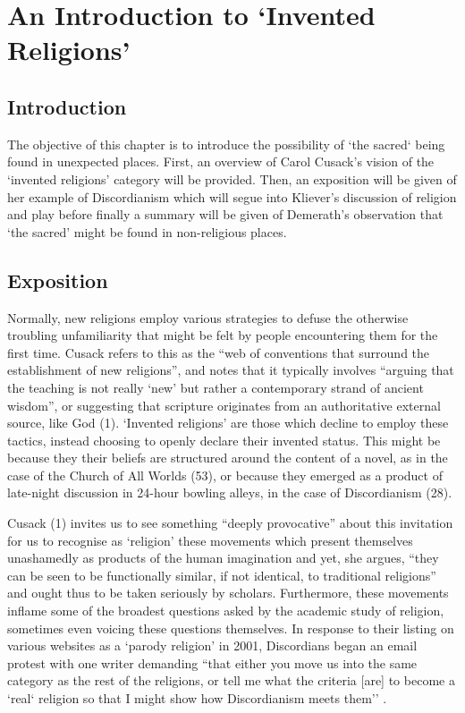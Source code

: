 \documentclass[Draft.tex]{subfiles}
\begin{document}
\chapter{An Introduction to `Invented Religions'}

\section*{Introduction}
The objective of this chapter is to introduce the possibility of
`the sacred` being found in unexpected places.
First, an overview of Carol Cusack's vision of
the `invented religions' category will be provided.
Then, an exposition will be given of her example of Discordianism
which will segue into Kliever's discussion of religion and play
before finally a summary will be given of Demerath's observation
that `the sacred' might be found in non-religious places.


\section*{Exposition}
Normally, new religions employ various strategies
to defuse the otherwise troubling unfamiliarity
that might be felt by people encountering them for the first time.
Cusack refers to this as the
``web of conventions that surround the establishment of new religions'',
and notes that it typically involves
``arguing that the teaching is not really `new' but rather
a contemporary strand of ancient wisdom'',
or suggesting that scripture originates from
an authoritative external source, like God (1).
`Invented religions' are those which decline to employ these tactics,
instead choosing to openly declare their invented status.
This might be because they their beliefs are structured around
the content of a novel,
as in the case of the Church of All Worlds (53),
or because they emerged as a product of late-night discussion in
24-hour bowling alleys, in the case of Discordianism (28).

Cusack (1) invites us to see something ``deeply provocative''
about this invitation for us to recognise as `religion'
these movements which present themselves unashamedly as
products of the human imagination and yet, she argues,
``they can be seen to be functionally similar, if not identical, 
to traditional religions''
and ought thus to be taken seriously by scholars.
Furthermore, these movements inflame some of
the broadest questions asked by the academic study of religion,
sometimes even voicing these questions themselves.
In response to their listing on various websites as a `parody religion'
in 2001, Discordians began an email protest with one writer demanding
``that either you move us into the same category
as the rest of the religions, or tell me what the criteria [are]
to become a `real` religion so that I might show how Discordianism meets them''
\parencite[209]{Chidester05}.
\end{document}
